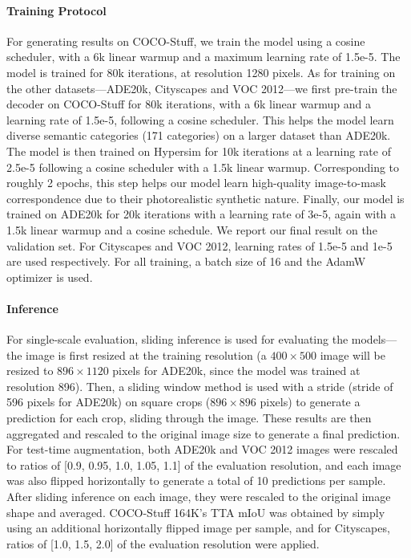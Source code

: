 \paragraph{Training Protocol}
For generating results on COCO-Stuff, we train the model using a cosine scheduler, with a 6k linear warmup and a maximum learning rate of 1.5e-5. 
The model is trained for 80k iterations, at resolution 1280 pixels.
As for training on the other datasets---ADE20k, Cityscapes and VOC 2012---we first pre-train the decoder on COCO-Stuff for 80k iterations, with a 6k linear warmup and a learning rate of 1.5e-5, following a cosine scheduler. 
This helps the model learn diverse semantic categories (171 categories) on a larger dataset than ADE20k. 
The model is then trained on Hypersim for 10k iterations at a learning rate of 2.5e-5 following a cosine scheduler with a 1.5k linear warmup. 
Corresponding to roughly 2 epochs, this step helps our model learn high-quality image-to-mask correspondence due to their photorealistic synthetic nature.
Finally, our model is trained on ADE20k for 20k iterations with a learning rate of 3e-5, again with a 1.5k linear warmup and a cosine schedule. 
We report our final result on the validation set. 
For Cityscapes and VOC 2012, learning rates of 1.5e-5 and 1e-5 are used respectively. 
For all training, a batch size of 16 and the AdamW optimizer is used.

\paragraph{Inference}
For single-scale evaluation, sliding inference is used for evaluating the models---the image is first resized at the training resolution (\eg a $400 \times 500$ image will be resized to $896 \times 1120$ pixels for ADE20k, since the model was trained at resolution 896). Then, a sliding window method is used with a stride (\eg stride of 596 pixels for ADE20k) on square crops (\eg $896 \times 896$ pixels) to generate a prediction for each crop, sliding through the image. 
These results are then aggregated and rescaled to the original image size to generate a final prediction.
For test-time augmentation, both ADE20k and VOC 2012 images were rescaled to ratios of [0.9, 0.95, 1.0, 1.05, 1.1] of the evaluation resolution, and each image was also flipped horizontally to generate a total of 10 predictions per sample. 
After sliding inference on each image, they were rescaled to the original image shape and averaged. 
COCO-Stuff 164K's TTA mIoU was obtained by simply using an additional horizontally flipped image per sample, and for Cityscapes, ratios of [1.0, 1.5, 2.0] of the evaluation resolution were applied.

